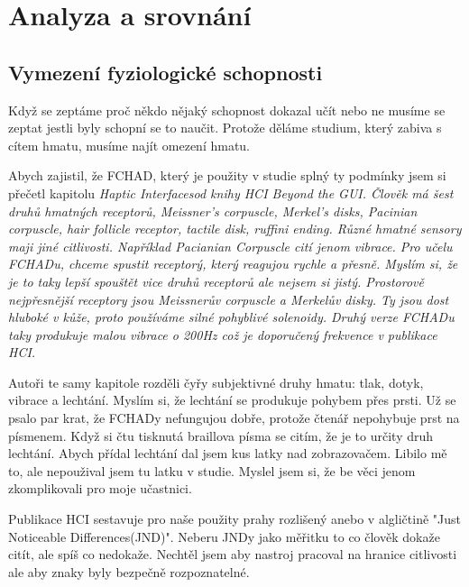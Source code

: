 \chapter{Analyza a srovnání}

\section{Vymezení fyziologické schopnosti}
Když se zeptáme proč někdo nějaký schopnost dokazal učít nebo ne musíme se zeptat jestli byly schopní se to naučit.  Protože děláme studium, který zabiva s cítem hmatu, musíme najít omezení hmatu.

Abych zajistil, že FCHAD, který je použity v studie splný ty podmínky jsem si přečetl kapitolu \em Haptic Interfaces\em  od knihy \em HCI Beyond the GUI\em. Člověk má šest druhů hmatných receptorů, Meissner's corpuscle, Merkel's disks, Pacinian corpuscle, hair follicle receptor, tactile disk, ruffini ending. Různé hmatné sensory maji jiné citlivosti.  Například Pacianian Corpuscle cití jenom vibrace.  Pro učelu FCHADu, chceme spustit receptorý, který reagujou rychle a přesně.  Myslím si, že je to taky lepší spouštět vice druhů receptorů ale nejsem si jistý.  Prostorově nejpřesnější receptory jsou Meissnerův corpuscle a Merkelův disky.  Ty jsou dost hluboké v kůže, proto používáme silné pohyblivé solenoidy.  Druhý verze FCHADu taky produkuje malou vibrace o 200Hz což je doporučený frekvence v publikace HCI\citep[str. 29-30]{nielsen2008gesture}.

Autoři te samy kapitole rozděli čyřy subjektivné druhy hmatu: tlak, dotyk, vibrace a lechtání.  Myslím si, že lechtání se produkuje pohybem přes prsti. Už se psalo par krat, že FCHADy nefungujou dobře, protože čtenář nepohybuje prst na písmenem.  Když si čtu tisknutá braillova písma se citím, že je to určity druh lechtání.  Abych přídal lechtání dal jsem kus latky nad zobrazovačem.  Libilo mě to, ale nepoužival jsem tu latku v studie. Myslel jsem si, že be věci jenom zkomplikovali pro moje učastnici.

Publikace HCI sestavuje pro naše použity prahy rozlišený anebo v algličtině "Just Noticeable Differences(JND)". Neberu JNDy jako měřitku to co člověk dokaže citít, ale spíš co nedokaže.  Nechtěl jsem aby nastroj pracoval na hranice citlivosti ale aby znaky byly bezpečně rozpoznatelné.


